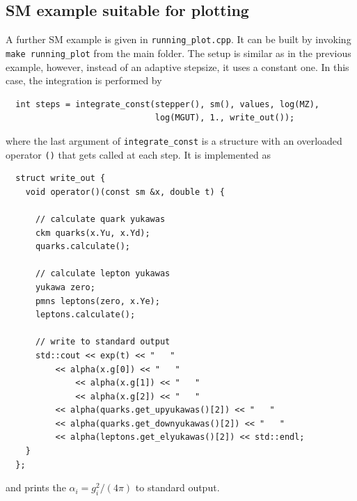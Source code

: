 \documentclass[11pt,a4paper]{article}
\begin{document}
\subsection{\label{sec::sm_plot_example} SM example suitable for plotting}
A further SM example is given in \texttt{running\_plot.cpp}. It can be built by invoking \texttt{make running\_plot} from the main folder.
The setup is similar as in the previous example, however, instead of an adaptive stepsize, it uses a constant one.
In this case, the integration is performed by
\begin{lstlisting}
  int steps = integrate_const(stepper(), sm(), values, log(MZ),
                              log(MGUT), 1., write_out());
\end{lstlisting}
where the last argument of \texttt{integrate\_const} is a structure with an overloaded operator \texttt{()} that gets called at each step.
It is implemented as
\begin{lstlisting}
  struct write_out {
    void operator()(const sm &x, double t) {

      // calculate quark yukawas
      ckm quarks(x.Yu, x.Yd);
      quarks.calculate();

      // calculate lepton yukawas
      yukawa zero;
      pmns leptons(zero, x.Ye);
      leptons.calculate();
    
      // write to standard output
      std::cout << exp(t) << "   "
	      << alpha(x.g[0]) << "   "
      	      << alpha(x.g[1]) << "   "
      	      << alpha(x.g[2]) << "   "
	      << alpha(quarks.get_upyukawas()[2]) << "   "
	      << alpha(quarks.get_downyukawas()[2]) << "   "
	      << alpha(leptons.get_elyukawas()[2]) << std::endl;
    }
  };
\end{lstlisting}
and prints the $\alpha_i = g_i^2/\left(4\pi\right)$ to standard output.
\end{document}
